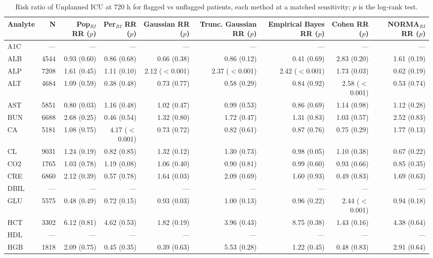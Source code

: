 \begin{table}[ht]
\centering
\footnotesize
\caption{Risk ratio of Unplanned ICU at 720 h for flagged vs unflagged patients, each method at a matched sensitivity; $p$ is the log-rank test.}
\begin{tabular}{lrrrrrrrr}
\toprule
Analyte & N & Pop$_{RI}$ RR ($p$) & Per$_{RI}$ RR ($p$) & Gaussian RR ($p$) & Trunc. Gaussian RR ($p$) & Empirical Bayes RR ($p$) & Cohen RR ($p$) & NORMA$_{RI}$ RR ($p$) \\
\midrule
A1C & --- & --- & --- & --- & --- & --- & --- & --- \\
ALB & 4544 & 0.93 (0.60) & 0.86 (0.68) & 0.66 (0.38) & 0.86 (0.12) & 0.41 (0.69) & 2.83 (0.20) & 1.61 (0.19) \\
ALP & 7208 & 1.61 (0.45) & 1.11 (0.10) & 2.12 ($<$0.001) & 2.37 ($<$0.001) & 2.42 ($<$0.001) & 1.73 (0.03) & 0.62 (0.19) \\
ALT & 4684 & 1.09 (0.59) & 0.38 (0.48) & 0.73 (0.77) & 0.58 (0.29) & 0.84 (0.92) & 2.58 ($<$0.001) & 0.53 (0.74) \\
AST & 5851 & 0.80 (0.03) & 1.16 (0.48) & 1.02 (0.47) & 0.99 (0.53) & 0.86 (0.69) & 1.14 (0.98) & 1.12 (0.28) \\
BUN & 6688 & 2.68 (0.25) & 0.46 (0.54) & 1.32 (0.80) & 1.72 (0.47) & 1.31 (0.83) & 1.03 (0.57) & 2.52 (0.83) \\
CA & 5181 & 1.08 (0.75) & 4.17 ($<$0.001) & 0.73 (0.72) & 0.82 (0.61) & 0.87 (0.76) & 0.75 (0.29) & 1.77 (0.13) \\
CL & 9031 & 1.24 (0.19) & 0.82 (0.85) & 1.32 (0.12) & 1.30 (0.73) & 0.98 (0.05) & 1.10 (0.38) & 0.67 (0.22) \\
CO2 & 1765 & 1.03 (0.78) & 1.19 (0.08) & 1.06 (0.40) & 0.90 (0.81) & 0.99 (0.60) & 0.93 (0.66) & 0.85 (0.35) \\
CRE & 6860 & 2.12 (0.39) & 0.57 (0.78) & 1.64 (0.03) & 2.09 (0.69) & 1.60 (0.93) & 0.49 (0.83) & 1.69 (0.63) \\
DBIL & --- & --- & --- & --- & --- & --- & --- & --- \\
GLU & 5575 & 0.48 (0.49) & 0.72 (0.15) & 0.93 (0.03) & 1.00 (0.13) & 0.96 (0.22) & 2.44 ($<$0.001) & 0.94 (0.18) \\
HCT & 3302 & 6.12 (0.81) & 4.62 (0.53) & 1.82 (0.19) & 3.96 (0.43) & 8.75 (0.38) & 1.43 (0.16) & 4.38 (0.64) \\
HDL & --- & --- & --- & --- & --- & --- & --- & --- \\
HGB & 1818 & 2.09 (0.75) & 0.45 (0.35) & 0.39 (0.63) & 5.53 (0.28) & 1.22 (0.45) & 0.48 (0.83) & 2.91 (0.64) \\

\end{tabular}
\end{table}
